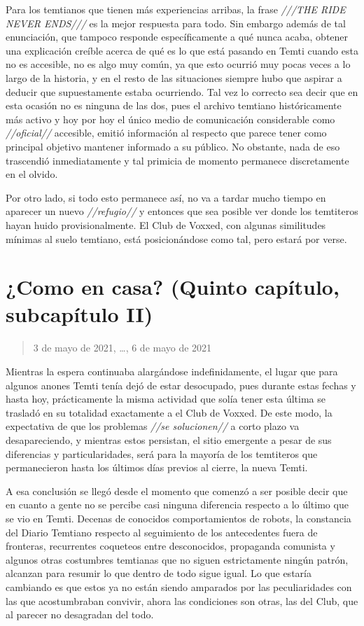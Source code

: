 \documentclass[
  spanish,
]{book}
\begin{document}
Para los temtianos que tienen más experiencias arribas, la frase \emph{///THE RIDE NEVER ENDS///} es la mejor respuesta para todo. Sin embargo además de tal enunciación, que tampoco responde específicamente a qué nunca acaba, obtener una explicación creíble acerca de qué es lo que está pasando en Temti cuando esta no es accesible, no es algo muy común, ya que esto ocurrió muy pocas veces a lo largo de la historia, y en el resto de las situaciones siempre hubo que aspirar a deducir que supuestamente estaba ocurriendo. Tal vez lo correcto sea decir que en esta ocasión no es ninguna de las dos, pues el archivo temtiano históricamente más activo y hoy por hoy el único medio de comunicación considerable como \emph{//oficial//} accesible, emitió información al respecto que parece tener como principal objetivo mantener informado a su público. No obstante, nada de eso trascendió inmediatamente y tal primicia de momento permanece discretamente en el olvido.

Por otro lado, si todo esto permanece así, no va a tardar mucho tiempo en aparecer un nuevo \emph{//refugio//} y entonces que sea posible ver donde los temtiteros hayan huido provisionalmente. El Club de Voxxed, con algunas similitudes mínimas al suelo temtiano, está posicionándose como tal, pero estará por verse.

\hypertarget{como-en-casa-quinto-capuxedtulo-subcapuxedtulo-ii}{%
\section{¿Como en casa? (Quinto capítulo, subcapítulo II)}\label{como-en-casa-quinto-capuxedtulo-subcapuxedtulo-ii}}

\begin{quote}
3 de mayo de 2021, \ldots, 6 de mayo de 2021
\end{quote}

Mientras la espera continuaba alargándose indefinidamente, el lugar que para algunos anones Temti tenía dejó de estar desocupado, pues durante estas fechas y hasta hoy, prácticamente la misma actividad que solía tener esta última se trasladó en su totalidad exactamente a el Club de Voxxed. De este modo, la expectativa de que los problemas \emph{//se solucionen//} a corto plazo va desapareciendo, y mientras estos persistan, el sitio emergente a pesar de sus diferencias y particularidades, será para la mayoría de los temtiteros que permanecieron hasta los últimos días previos al cierre, la nueva Temti.

A esa conclusión se llegó desde el momento que comenzó a ser posible decir que en cuanto a gente no se percibe casi ninguna diferencia respecto a lo último que se vio en Temti. Decenas de conocidos comportamientos de robots, la constancia del Diario Temtiano respecto al seguimiento de los antecedentes fuera de fronteras, recurrentes coqueteos entre desconocidos, propaganda comunista y algunos otras costumbres temtianas que no siguen estrictamente ningún patrón, alcanzan para resumir lo que dentro de todo sigue igual. Lo que estaría cambiando es que estos ya no están siendo amparados por las peculiaridades con las que acostumbraban convivir, ahora las condiciones son otras, las del Club, que al parecer no desagradan del todo.
\end{document}
